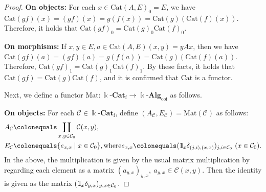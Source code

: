 \documentclass{surv-l}
\numberwithin{equation}{chapter}
\numberwithin{figure}{chapter}
\theoremstyle{plain}
\theoremstyle{definition}
\theoremstyle{remark}
\newcommand{\id}{1\kern-.25em{\text{{\rm l}}}}
\newcommand{\kCat}{\Bbbk\text{-}\mathbf{Cat}}
\begin{document}
\begin{proof}
{\bf On objects:}
For each $x \in \mathrm{Cat}(A,E)_0 = E$, we have
$\mathrm{Cat}(gf)(x) = (gf)(x) = g(f(x)) = \mathrm{Cat}(g)(\mathrm{Cat}(f)(x))$.
Therefore, it holds that
$\mathrm{Cat}(gf)_0 = \mathrm{Cat}(g)_0 \mathrm{Cat}(f)_0$.

{\bf On morphisms:}
If $x,y \in E, a\in \mathrm{Cat}(A,E)(x,y)=yAx$, then we have
$\mathrm{Cat}(gf)(a) = (gf)(a) = g(f(a)) = \mathrm{Cat}(g)(\mathrm{Cat}(f)(a))$.
Therefore, $\mathrm{Cat}(gf)_1 = \mathrm{Cat}(g)_1 \mathrm{Cat}(f)_1$.
By these facts, it holds that $\mathrm{Cat}(gf) = \mathrm{Cat}(g) \mathrm{Cat}(f)$, and it is confirmed
that $\mathrm{Cat}$ is a functor.

\medskip
Next, we define a functor $\mathrm{Mat} \colon \kCat_{\mathrm{f}} \to \Bbbk\text{-}\mathbf{Alg}_{\mathrm{coi}}$ as follows.

{\bf On objects:}
For each ${\mathcal{C}} \in \kCat_{\mathrm{f}}$, define $(A_{\mathcal{C}}, E_{\mathcal{C}}) = \mathrm{Mat}({\mathcal{C}})$ as follows:
\[
\begin{aligned}
A_{{\mathcal{C}}}&\colonequals  \coprod_{x,y\in {\mathcal{C}}_0}{\mathcal{C}}(x,y),\\
E_{{\mathcal{C}}}&\colonequals \{e_{x,x} \mid x \in {\mathcal{C}}_0\}, \text{where} e_{x,x}\colonequals  (\id_x\delta_{(j,i),(x,x)})_{j,i\in {\mathcal{C}}_0}\ (x \in {\mathcal{C}}_0).
\end{aligned}
\]
In the above, the multiplication is given by the usual matrix multiplication by
regarding each element as a matrix $(a_{y,x})_{y,x},\ a_{y,x} \in {\mathcal{C}}(x,y)$.
Then the identity is given as the matrix $(\id_x\delta_{y,x})_{y,x\in {\mathcal{C}}_0}$.


\end{proof}
\end{document}
